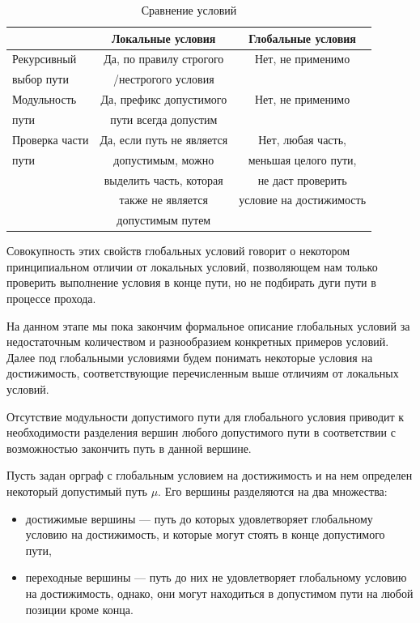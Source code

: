 	\begin{table}[H]
		\begin{tabular}{l | c | c }
			& Локальные условия & Глобальные условия \\
			\hline \hline
			Рекурсивный            & Да, по правилу строгого    & Нет, не применимо \\
			выбор пути			   & /нестрогого условия	    & \\
			\hline \hline
			Модульность            & Да, префикс допустимого    & Нет, не применимо \\
			пути			       & пути всегда допустим       & \\
			\hline \hline
			Проверка части         & Да, если путь не является  & Нет, любая часть, \\
			пути			       & допустимым, можно 			& меньшая целого пути, \\
			& выделить часть, которая    & не даст проверить \\
			& также не является      	& условие на достижимость \\
			& допустимым путем
		\end{tabular}
		\caption{Сравнение условий}
		\label{tabl:Compare}
	\end{table}
	
	Совокупность этих свойств глобальных условий говорит о некотором принципиальном отличии от локальных условий, позволяющем нам только проверить выполнение условия в конце пути, но не подбирать дуги пути в процессе прохода. 
	
	На данном этапе мы пока закончим формальное описание глобальных условий за недостаточным количеством и разнообразием конкретных примеров условий. Далее под глобальными условиями будем понимать некоторые условия на достижимость, соответствующие перечисленным выше отличиям от локальных условий.   
	
	Отсутствие модульности допустимого пути для глобального условия приводит к необходимости разделения вершин любого допустимого пути в соответствии с возможностью закончить путь в данной вершине. 
	
	\begin{mydefinition}
		Пусть задан орграф с глобальным условием на достижимость и на нем определен некоторый допустимый путь $\mu$. Его вершины разделяются на два множества:
		\begin{itemize}
			\item достижимые вершины --- путь до которых удовлетворяет глобальному условию на достижимость, и которые могут стоять в конце допустимого пути,
			\item переходные вершины --- путь до них не удовлетворяет глобальному условию на достижимость, однако, они могут находиться в допустимом пути на любой позиции кроме конца.
		\end{itemize}
	\end{mydefinition}

